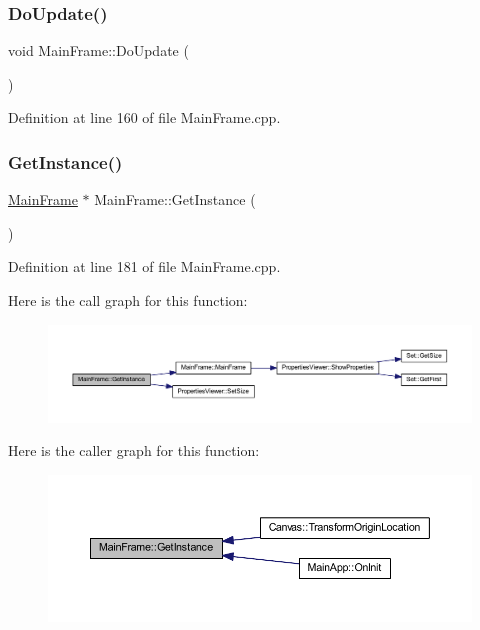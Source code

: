 \subsubsection{\texorpdfstring{Do\+Update()}{DoUpdate()}}
{\footnotesize\ttfamily void Main\+Frame\+::\+Do\+Update (\begin{DoxyParamCaption}{ }\end{DoxyParamCaption})}



Definition at line 160 of file Main\+Frame.\+cpp.

\mbox{\label{class_main_frame_a17926c75eb083f5b8249696c4cdccf55}} 
\subsubsection{\texorpdfstring{Get\+Instance()}{GetInstance()}}
{\footnotesize\ttfamily \hyperlink{class_main_frame}{Main\+Frame} $\ast$ Main\+Frame\+::\+Get\+Instance (\begin{DoxyParamCaption}{ }\end{DoxyParamCaption})\hspace{0.3cm}{\ttfamily [static]}}



Definition at line 181 of file Main\+Frame.\+cpp.

Here is the call graph for this function\+:
\nopagebreak
\begin{figure}[H]
\begin{center}
\leavevmode
\includegraphics[width=350pt]{class_main_frame_a17926c75eb083f5b8249696c4cdccf55_cgraph}
\end{center}
\end{figure}
Here is the caller graph for this function\+:
\nopagebreak
\begin{figure}[H]
\begin{center}
\leavevmode
\includegraphics[width=350pt]{class_main_frame_a17926c75eb083f5b8249696c4cdccf55_icgraph}
\end{center}
\end{figure}
\mbox{\label{class_main_frame_af5c0679e1a94303e8bd0a0742c25a59b}} 
